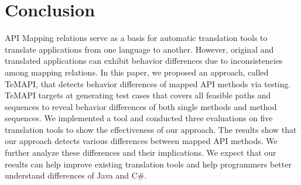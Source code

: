 \section{Conclusion}
\label{sec:conclusion}

API Mapping relations serve as a basis for automatic translation tools to translate applications from one language to another. However, original and translated applications can exhibit behavior differences due to inconsistencies among mapping relations. In this paper, we proposed an approach, called TeMAPI, that detects behavior differences of mapped API methods via testing. TeMAPI targets at generating test cases that covers all feasible paths and  sequences to reveal behavior differences of both single methods and method sequences. We implemented a tool and conducted three evaluations on five translation tools to show the effectiveness of our approach. The results show that our approach detects various differences between mapped API methods. We further analyze these differences and their implications. We expect that our results can help improve existing translation tools and help programmers better understand differences of Java and C\#.

